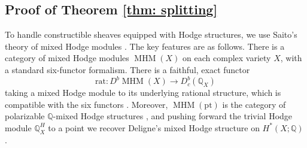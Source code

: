 \documentclass[11pt,reqno]{amsart}
\theoremstyle{plain} %
\newtheorem{prop}[theorem]{Proposition}
\theoremstyle{definition}
\newtheorem{remark}[theorem]{Remark}
\newcommand{\QQ}{\mathbb{Q}}
\newcommand{\M}{\mathcal{M}}
\newcommand{\C}{\mathcal{C}}
\newcommand{\mc}{\mathcal}
\newcommand{\ZZ}{\mathbb{Z}}
\DeclareMathOperator{\GL}{GL}
\DeclareMathOperator{\PGL}{PGL}
\DeclareMathOperator{\MHM}{MHM}
\newcommand{\Dol}{\mathrm{Dol}}
\renewcommand{\AA}{\mathbb{A}}
\begin{document}

\subsection{Proof of Theorem \ref{thm: splitting}} \label{subsec: Saito}

To handle constructible sheaves equipped with Hodge structures, we use Saito's theory of mixed Hodge modules  \cite{Saito}. The key features are as follows. There is a category of mixed Hodge modules $\MHM(X)$ on each complex variety $X$, with a standard six-functor formalism. There is a faithful, exact functor
\begin{equation} \label{eq:rat}
\mathrm{rat}\colon D^b \MHM(X) \to D^b_c(\QQ_X)
\end{equation}
taking a mixed Hodge module to its underlying rational structure, %
which is compatible with the six functors \cite[Theorem 0.1]{Saito}. Moreover, $\MHM(\mathrm{pt})$ is the category of polarizable $\QQ$-mixed Hodge structures \cite[(4.2.12)]{Saito}, and pushing forward the trivial Hodge module $\QQ^H_X$ to a point we recover Deligne's mixed Hodge structure on $H^*(X;\QQ)$  \cite[p.~328]{Saito}. 
\end{document}

